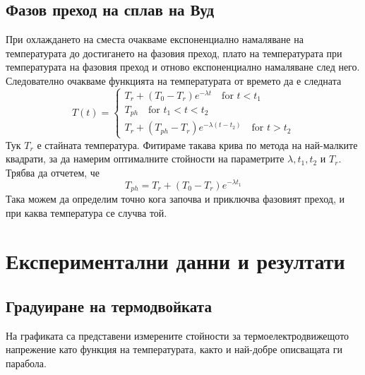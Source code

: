 \documentclass[%
 reprint,
 amsmath,amssymb,
 aps,
]{revtex4-2}
\begin{document}
\subsection{Фазов преход на сплав на Вуд}
При охлаждането на сместа очакваме експоненциално намаляване на температурата до достигането на фазовия преход, плато на температурата при температурата на фазовия преход и отново експоненциално намаляване след него. Следователно очакваме функцията на температурата от времето да е следната
\begin{equation*} \label{eq:1}
    T(t) = \begin{cases}
        T_r + (T_0 - T_r) e^{-\lambda t} \quad \text{for } t < t_1 \\
        T_{ph} \quad \text{for } t_1 < t < t_2 \\
        T_r + (T_{ph} - T_r) e^{-\lambda (t - t_2)} \quad \text{for } t > t_2
    \end{cases} \tag{1}
\end{equation*}
Тук $T_r$ е стайната температура. Фитираме такава крива по метода на най-малките квадрати, за да намерим оптималните стойности на параметрите $\lambda, t_1, t_2 \text{ и } T_r$. Трябва да отчетем, че
\begin{equation*}
    T_{ph} = T_r + (T_0 - T_r) e^{-\lambda t_1}
\end{equation*}
Така можем да определим точно кога започва и приключва фазовият преход, и при каква температура се случва той. 

\section{Експериментални данни и резултати}
\subsection{Градуиране на термодвойката}
На графиката са представени измерените стойности за термоелектродвижещото напрежение като функция на температурата, както и най-добре описващата ги парабола. 
\end{document}
